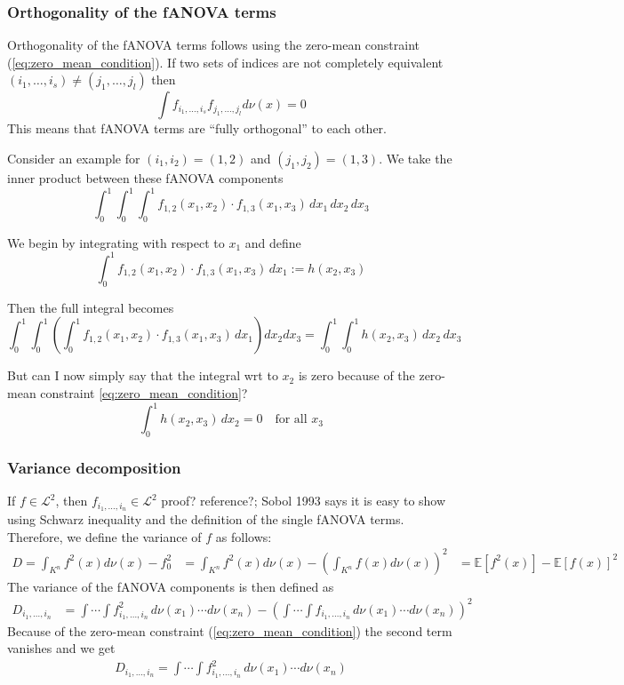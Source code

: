 \subsubsection*{Orthogonality of the fANOVA terms}
Orthogonality of the fANOVA terms follows using the zero-mean constraint (\autoref{eq:zero_mean_condition}). If two sets of indices are not completely equivalent $(i_1, \dots, i_s) \neq (j_1, \dots, j_l)$ then
\begin{equation}
    \int f_{i_{1}, \dots, i_{s}} f_{j_{1}, \dots, j_{l}} d\nu(x) = 0
    \label{eq:orthogonality}
\end{equation}
This means that fANOVA terms are ``fully orthogonal'' to each other.\par
Consider an example for $(i_1, i_2) = (1, 2)$ and $(j_1, j_2) = (1, 3)$. We take the inner product between these fANOVA components
\[
\int_0^1 \int_0^1 \int_0^1 f_{1,2}(x_1, x_2) \cdot f_{1,3}(x_1, x_3) \, dx_1 \, dx_2 \, dx_3
\]

We begin by integrating with respect to \( x_1 \) and define
\[
\int_0^1 f_{1,2}(x_1, x_2) \cdot f_{1,3}(x_1, x_3) \, dx_1 := h(x_2, x_3)
\]

Then the full integral becomes
\[
\int_0^1 \int_0^1 \left( \int_0^1 f_{1,2}(x_1, x_2) \cdot f_{1,3}(x_1, x_3) \, dx_1 \right) dx_2 dx_3 = \int_0^1 \int_0^1 h(x_2, x_3) \, dx_2 \, dx_3
\]

But can I now simply say that the integral wrt to $x_2$ is zero because of the zero-mean constraint \autoref{eq:zero_mean_condition}?
\[
\int_0^1 h(x_2, x_3) \, dx_2 = 0 \quad \text{for all } x_3
\]


\subsubsection*{Variance decomposition}
If $f \in \mathcal{L}^2$, then $f_{i_{1}, \dots, i_{n}} \in \mathcal{L}^2$ {\color{blue}proof? reference?; Sobol 1993 says it is easy to show using Schwarz inequality and the definition of the single fANOVA terms.}
Therefore, we define the variance of $f$ as follows:
\begin{align*}
    D = \int_{K^n} f^2(x)d\nu (x) - f^2_{0} &= \int_{K^n} f^2(x)d\nu (x) - (\int_{K^n} f(x)d\nu (x))^2 &= \mathbb{E}[f^2(x)] - \mathbb{E}[f(x)]^2
    \label{variance_whole}
\end{align*}
The variance of the fANOVA components is then defined as
\begin{align*}
    D_{i_{1}, \dots, i_{n}} 
    &= \int \cdots \int f^2_{i_{1}, \dots, i_{n}} \, d\nu(x_1) \cdots d\nu(x_n) - \left( \int \cdots \int f_{i_{1}, \dots, i_{n}} \, d\nu(x_1) \cdots d\nu(x_n) \right)^2
\end{align*}
Because of the zero-mean constraint (\autoref{eq:zero_mean_condition}) the second term vanishes and we get
\begin{align*}
    D_{i_{1}, \dots, i_{n}} = \int \cdots \int f^2_{i_{1}, \dots, i_{n}} \, d\nu(x_1) \cdots d\nu(x_n)
\end{align*}

